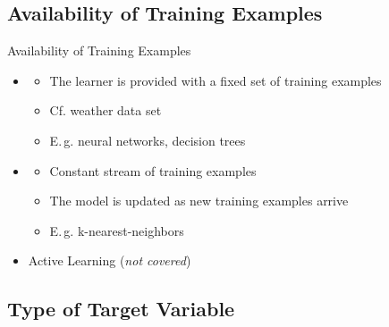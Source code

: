 \subsection{Availability of Training Examples}

\begin{frame}{Availability of Training Examples}{}
	\begin{itemize}
		\item {}
		\begin{itemize}
			\item The learner is provided with a fixed set of training examples
			\item Cf. weather data set
			\item E.\,g. neural networks, decision trees
		\end{itemize}
		\item {}
		\begin{itemize}
			\item Constant stream of training examples
			\item The model is updated as new training examples arrive
			\item E.\,g. k-nearest-neighbors
		\end{itemize}
		\item Active Learning (\textit{not covered})
	\end{itemize}
\end{frame}


\subsection{Type of Target Variable}

